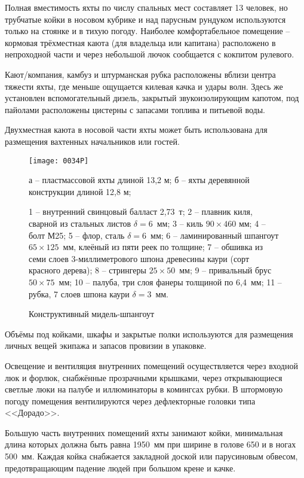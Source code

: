 Полная вместимость яхты по числу спальных мест составляет 13 человек,
но трубчатые койки в носовом кубрике и над парусным рундуком
используются только на стоянке и в тихую погоду. Наиболее
комфортабельное помещение \--- кормовая трёхместная каюта (для
владельца или капитана) расположено в непроходной части и через
небольшой лючок сообщается с кокпитом рулевого.

Кают\-/компания, камбуз и штурманская рубка расположены вблизи центра
тяжести яхты, где меньше ощущается килевая качка и удары волн. Здесь
же установлен вспомогательный дизель, закрытый звукоизолирующим
капотом, под пайолами расположены цистерны с запасами топлива и
питьевой воды.

Двухместная каюта в носовой части яхты может быть использована для
размещения вахтенных начальников или гостей.

\begin{figure}[htb]
  \centering
  \texttt{[image: 0034P]}
  \caption{Конструктивный мидель-шпангоут}
  \label{fig:34}
  \scriptsize
  \centering{}
а \--- пластмассовой яхты длиной 13,2 м; б \--- яхты деревянной конструкции длиной 12,8 м; 

1 \--- внутренний свинцовый балласт 2,73~т; 2 \--- плавник киля, сварной из стальных листов $\delta = 6$~мм; 3 \--- киль $90 \times 460$ мм; 4 \--- болт М25; 5 \--- флор, сталь $\delta = 6$~мм; 6 \--- ламинированный шпангоут $65 \times 125$~мм, клеёный из пяти реек по толщине; 7 \--- обшивка из семи слоев 3-миллиметрового шпона древесины каури (сорт красного дерева); 8 \--- стрингеры $25 \times 50$~мм; 9 \--- привальный брус $50 \times 75$~мм; 10 \--- палуба, три слоя фанеры толщиной по 6,4~мм; 11 \--- рубка, 7 слоев шпона каури $\delta = 3$~мм. 
\end{figure}

Объёмы под койками, шкафы и закрытые полки используются для размещения
личных вещей экипажа и запасов провизии в упаковке.

Освещение и вентиляция внутренних помещений осуществляется через
входной люк и форлюк, снабжённые прозрачными крышками, через
открывающиеся светлые люки на палубе и иллюминаторы в комингсах
рубки. В штормовую погоду помещения вентилируются через дефлекторные
головки типа <<Дорадо>>.

Большую часть внутренних помещений яхты занимают койки, минимальная
длина которых должна быть равна 1950~мм при ширине в голове 650 и в
ногах 500~мм. Каждая койка снабжается закладной доской или парусиновым
обвесом, предотвращающим падение людей при большом крене и качке.

